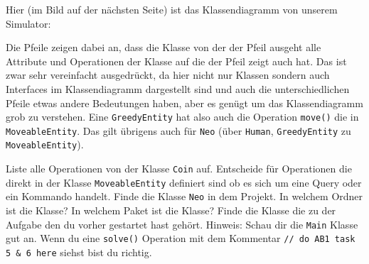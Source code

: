 Hier (im Bild auf der nächsten Seite) ist das Klassendiagramm von unserem Simulator:

    Die Pfeile zeigen dabei an, dass die Klasse von der der Pfeil ausgeht alle Attribute und Operationen der Klasse auf die der Pfeil zeigt auch hat.
    Das ist zwar sehr vereinfacht ausgedrückt, da hier nicht nur Klassen sondern auch Interfaces im Klassendiagramm dargestellt sind und auch die unterschiedlichen Pfeile etwas andere Bedeutungen haben, aber es genügt um das Klassendiagramm grob zu verstehen.
    Eine \texttt{GreedyEntity} hat also auch die Operation \texttt{move()} die in \texttt{MoveableEntity}.
    Das gilt übrigens auch für \texttt{Neo} (über \texttt{Human}, \texttt{GreedyEntity} zu \texttt{MoveableEntity}).

    
        \subexcercise Liste alle Operationen von der Klasse \texttt{Coin} auf.
        \subexcercise Entscheide für Operationen die direkt in der Klasse \texttt{MoveableEntity} definiert sind ob es sich um eine Query oder ein Kommando handelt.
        \subexcercise Finde die Klasse \texttt{Neo} in dem Projekt.
            In welchem Ordner ist die Klasse?
            In welchem Paket ist die Klasse?
        \subexcercise Finde die Klasse die zu der Aufgabe  den du vorher gestartet hast gehört.
            Hinweis: Schau dir die \texttt{Main} Klasse gut an.
            Wenn du eine \texttt{solve()} Operation mit dem Kommentar \texttt{// do AB1 task 5 \& 6 here} siehst bist du richtig.
    

